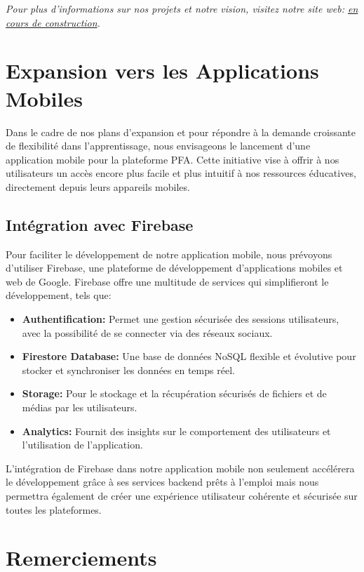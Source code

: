 \textit{Pour plus d'informations sur nos projets et notre vision, visitez notre site web: \href{http://www.pfa-education.com}{en cours de construction}.} 
\vfill

\section{Expansion vers les Applications Mobiles}
Dans le cadre de nos plans d'expansion et pour répondre à la demande croissante de flexibilité dans l'apprentissage, nous envisageons le lancement d'une application mobile pour la plateforme PFA. Cette initiative vise à offrir à nos utilisateurs un accès encore plus facile et plus intuitif à nos ressources éducatives, directement depuis leurs appareils mobiles.

\subsection{Intégration avec Firebase}
Pour faciliter le développement de notre application mobile, nous prévoyons d'utiliser Firebase, une plateforme de développement d'applications mobiles et web de Google. Firebase offre une multitude de services qui simplifieront le développement, tels que:

\begin{itemize}
    \item \textbf{Authentification:} Permet une gestion sécurisée des sessions utilisateurs, avec la possibilité de se connecter via des réseaux sociaux.
    \item \textbf{Firestore Database:} Une base de données NoSQL flexible et évolutive pour stocker et synchroniser les données en temps réel.
    \item \textbf{Storage:} Pour le stockage et la récupération sécurisés de fichiers et de médias par les utilisateurs.
    \item \textbf{Analytics:} Fournit des insights sur le comportement des utilisateurs et l'utilisation de l'application.
\end{itemize}

L'intégration de Firebase dans notre application mobile non seulement accélérera le développement grâce à ses services backend prêts à l'emploi mais nous permettra également de créer une expérience utilisateur cohérente et sécurisée sur toutes les plateformes.

\section{Remerciements}

